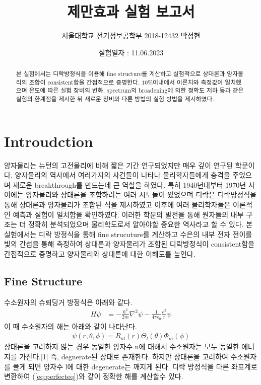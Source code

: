 \documentclass[%
 reprint,
 amsmath,amssymb,
 aps,
]{revtex4-2}
\begin{document}
\title{제만효과 실험 보고서}

\author{서울대학교 전기정보공학부 2018-12432 박정현}
\date{실험일자 : 11.06.2023}%

\begin{abstract}
본 실험에서는 디락방정식을 이용해 fine structure를 계산하고 실험적으로 상대론과 양자물리의 조합이 consistent함을 간접적으로 증명한다. $10\%$이내에서 이론치와 측정값이 일치했으며 온도에 따른 실험 장비의 변화, spectrum의 broadening에 의한 정확도 저하 등과 같은 실험의 한계점을 제시한 뒤 새로운 장비와 다른 방법의 실험 방법을 제시하였다.
\end{abstract}

\maketitle


\section{\label{sec:level1}Introudction}
양자물리는 뉴턴의 고전물리에 비해 짧은 기간 연구되었지만 매우 깊이 연구된 학문이다. 양자물리의 역사에서 여러가지의 사건들이 나타나 물리학자들에게 충격을 주었으며 새로운 breakthrough를 만드는데 큰 역할을 하였다. 특히 1940년대부터 1970년 사이에는 양자물리와 상대론을 조합하려는 여러 시도들이 있었으며 디락은 디락방정식을 통해 상대론과 양자물리가 조합된 식을 제시하였고 이후에 여러 물리학자들은 이론적인 예측과 실험이 일치함을 확인하였다. 이러한 학문의 발전을 통해 원자들의 내부 구조는 더 정확히 분석되었으며 물리학도로서 알아야할 중요한 역사라고 할 수 있다. 본 실험에서는 디락 방정식을 통해 fine strucuture를 계산하고 수은의 내부 전자 전이를 빛의 간섭을 통해 측정하여 상대론과 양자물리가 조합된 디락방정식이 consistent함을 간접적으로 증명하고 양자물리와 상대론에 대한 이해도를 높인다.
 
\subsection{\label{sec:level2}Fine Structure}
수소원자의 슈뢰딩거 방정식은 아래와 같다.
\begin{align}
	H\psi &= -\frac{\hbar^{2}}{2m}\nabla^{2}\psi - \frac{1}{4\pi \epsilon_{0}}\frac{e^{2}}{r}\psi
\end{align}
이 때 수소원자의 해는 아래와 같이 나타난다.
\begin{align}
	\psi(r,\theta,\phi) = R_{nl}(r)\Theta_{l}(\theta)\Phi_{m}(\phi)
\end{align}
상대론을 고려하지 않는 경우 동일한 양자수 n에 대해서 수소원자는 모두 동일한 에너지를 가진다.[1] 즉, degnerate된 상태로 존재한다. 하지만 상대론을 고려하여 수소원자를 풀게 되면 양자수 l에 대한 degenerate는 깨지게 된다. 디락 방정식을 다른 좌표계로 변환하여 (\ref{eq:perfecteq})와 같이 정확한 해를 계산할수 있다.
\end{document}
